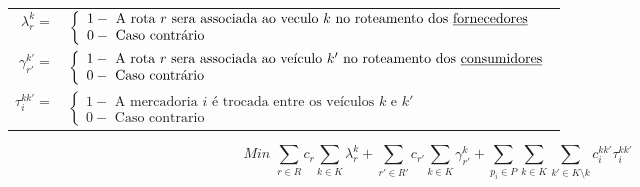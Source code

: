 \documentclass[12pt]{article}
\begin{document}
\begin{table}[!htb]
\begin{tabular}{rl}
\vspace{1mm}
$\lambda^k_r = $ &
$\left\{
\begin{array} {l}
1 - \textrm{ A rota } r \textrm{ sera associada ao veculo } k \textrm{ no roteamento dos \underline{fornecedores}} \\
0 - \textrm{ Caso contr\'ario}
\end{array} \right.
$
\\
\vspace{2mm}
$\gamma^{k'}_{r'} = $ &
$\left\{
\begin{array} {l}
1 - \textrm{ A rota } r \textrm{ sera associada ao ve\'iculo } k' \textrm{ no roteamento dos \underline{consumidores}} \\
0 - \textrm{ Caso contr\'ario}
\end{array} \right.
$
\\
\vspace{1mm}
$\tau^{kk'}_i = $ &
$\left\{
\begin{array} {l}
1 - \textrm{ A mercadoria } i \textrm{ \'e trocada entre os ve\'iculos } k \textrm{ e } k' \\
0 - \textrm{ Caso contrario } 
\end{array} \right.
$
\end{tabular}
\end{table}

\vspace{1cm}
\[
Min \,\, \sum\limits_{r \in R} {c_r \sum\limits_{k \in K}{\lambda^k_r}} + \sum\limits_{r' \in R'} {c_{r'} \sum\limits_{k \in K}{\gamma^k_{r'}}} + \sum\limits_{p_i \in P} { \sum\limits_{k \in K} { \sum\limits_{k' \in K \setminus k} { c^{kk'}_i \tau^{kk'}_i } } }
\]
\end{document}
